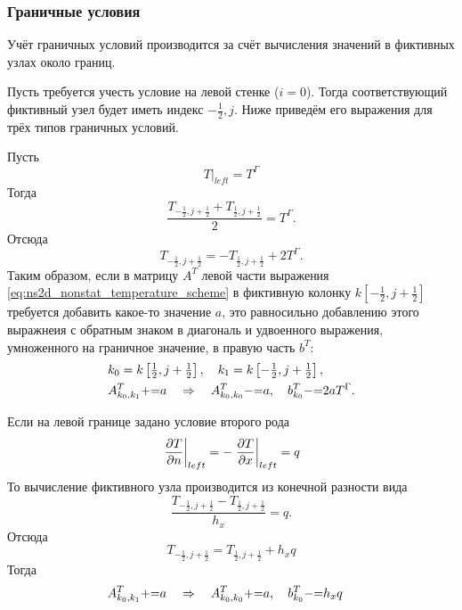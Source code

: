 \subsubsection{Граничные условия}

Учёт граничных условий производится за счёт вычисления значений в фиктивных узлах около границ.

Пусть требуется учесть условие на левой стенке ($i=0$).
Тогда соответствующий фиктивный узел будет иметь индекс $-\tfrac12, j$.
Ниже приведём его выражения для трёх типов граничных условий.

Пусть
\begin{equation}
\label{eq:ns2d_temperature_bc1}
\left. T\right|_{left} = T^{\Gamma}
\end{equation}
Тогда
$$
\frac{T_{-\tfrac12, j+\tfrac12} + T_{\tfrac12, j+\tfrac12}}{2} = T^{\Gamma}.
$$
Отсюда 
$$
T_{-\tfrac12, j+\tfrac12} = -T_{\tfrac12, j+\tfrac12} + 2 T^{\Gamma}.
$$
Таким образом, если в матрицу $A^T$ левой части выражения \cref{eq:ns2d_nonstat_temperature_scheme}
в фиктивную колонку $k\left[-\tfrac12, j+\tfrac12\right]$ требуется добавить
какое-то значение $a$, это равносильно добавлению этого выражнеия с обратным знаком в диагональ
и удвоенного выражения, умноженного на граничное значение, в правую часть $b^T$:
\begin{align}
\nonumber
&k_0 = k\left[\tfrac12, j + \tfrac12\right], \quad k_1 = k\left[-\tfrac12, j + \tfrac12\right], \\
\label{eq:ns2d_temperature_bc1_scheme}
&A^T_{k_0, k_1} {{+}{=}} a \quad\Rightarrow\quad
     A^T_{k_0, k_0} {{-}{=}} a, \quad b^T_{k_0} {{-}{=}} 2 a T^\Gamma.
\end{align}


Если на левой границе задано условие второго рода
\begin{equation}
\label{eq:ns2d_temperature_bc2}
\left.\frac{\partial T}{\partial n}\right|_{left} = -\left. \frac{\partial T}{\partial x} \right|_{left} = q
\end{equation}
То вычисление фиктивного узла производится из конечной разности вида
$$
\frac{T_{-\tfrac12, j+\tfrac12} - T_{\tfrac12, j+\tfrac12}}{h_x} = q.
$$
Отсюда 
$$
T_{-\tfrac12, j+\tfrac12} = T_{\tfrac12, j+\tfrac12} + h_x q
$$
Тогда
\begin{align}
\label{eq:ns2d_temperature_bc2_scheme}
&A^T_{k_0, k_1} {{+}{=}} a \quad\Rightarrow\quad
     A^T_{k_0, k_0} {{+}{=}} a, \quad b^T_{k_0} {{-}{=}} h_x q
\end{align}

